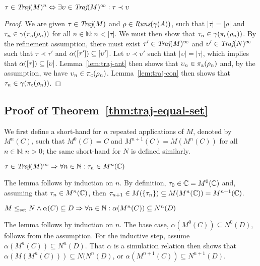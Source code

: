 \begin{lemma} \label{lem:traj-fin-inf}
$\tau \in \operatorname{\textit{Traj}}(M)^{n} \Leftrightarrow \exists \upsilon \in \operatorname{\textit{Traj}}(M)^{\infty} : \tau \prec \upsilon$
\end{lemma}
%

\begin{proof}
We are given $\tau \in \operatorname{\textit{Traj}}(M)$ and $\rho \in \operatorname{\textit{Runs}}(\gamma(A))$, such that $| \tau | = | \rho |$ and $\tau_{n} \in \gamma(\operatorname{\pi_{\textrm{a}}}(\rho_{n}))$ for all $n \in \mathbb{N} : n < | \tau |$. We must then show that $\tau_{n} \in \gamma(\operatorname{\pi_{\textrm{c}}}(\rho_{n}))$. By the refinement assumption, there must exist $\tau' \in \operatorname{\textit{Traj}}(M)^{\infty}$ and $\upsilon' \in \operatorname{\textit{Traj}}(N)^{\infty}$ such that $\tau \prec \tau'$ and $\alpha([\tau']) \subseteq [\upsilon']$. Let $\upsilon \prec \upsilon'$ such that $| \upsilon | = | \tau |$, which implies that $\alpha([\tau]) \subseteq [\upsilon]$. Lemma~\ref{lem:traj-ant} then shows that $\upsilon_{n} \in \operatorname{\pi_{\textrm{a}}}(\rho_{n})$ and, by the assumption, we have $\upsilon_{n} \in \operatorname{\pi_{\textrm{c}}}(\rho_{n})$. Lemma~\ref{lem:traj-con} then shows that $\tau_{n} \in \gamma(\operatorname{\pi_{\textrm{c}}}(\rho_{n}))$.
\end{proof}

\subsection{Proof of Theorem~\ref{thm:traj-equal-set}}

We first define a short-hand for $n$ repeated applications of $M$, denoted by $M^{n}(C)$, such that $M^{0}(C) = C$ and $M^{n+1}(C) = M(M^{n}(C))$ for all $n \in \mathbb{N} : n > 0$; the same short-hand for $N$ is defined similarly.

\begin{lemma} \label{lem:mn-traj}
$\tau \in \operatorname{\textit{Traj}}(M)^{\infty} \Rightarrow \forall n \in \mathbb{N} : \tau_{n} \in M^{n}(\mathbb{C})$
\end{lemma}
%
The lemma follows by induction on $n$. By definition, $\tau_{0} \in \mathbb{C} = M^{0}(\mathbb{C})$ and, assuming that $\tau_{n} \in M^{n}(\mathbb{C})$, then $\tau_{n+1} \in M(\{ \tau_{n} \}) \subseteq M(M^{n}(\mathbb{C})) = M^{n+1}(\mathbb{C})$.

\begin{lemma} \label{lem:mn-galois}
$M \leq_{\textrm{set}} N \wedge \alpha(C) \subseteq D \Rightarrow \forall n \in \mathbb{N} : \alpha(M^{n}(C)) \subseteq N^{n}(D)$
\end{lemma}
%
The lemma follows by induction on $n$. The base case, $\alpha(M^{0}(C)) \subseteq N^{0}(D)$, follows from the assumption. For the inductive step, assume $\alpha(M^{n}(C)) \subseteq N^{n}(D)$. That $\alpha$ is a simulation relation then shows that $\alpha(M(M^{n}(C))) \subseteq N(N^{n}(D)$, or $\alpha(M^{n+1}(C)) \subseteq N^{n+1}(D)$.

